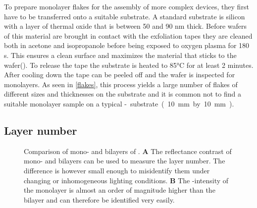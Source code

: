 To prepare monolayer flakes for the assembly of more complex devices, they first have to be transferred onto a suitable substrate. A standard substrate is silicon with a layer of thermal oxide that is between 50 and 90 nm thick. Before wafers of this material are brought in contact with the exfoliation tapes they are cleaned both in acetone and isopropanole before being exposed to oxygen plasma for 180 s. This ensures a clean surface and maximizes the material that sticks to the wafer(\cite{pizzocchero_hot_2016}). To release the tape the substrate is heated to 85°C for at least 2 minutes. After cooling down the tape can be peeled off and the wafer is inspected for monolayers. As seen in \ref{flakes}, this process yields a large number of flakes of different sizes and thicknesses on the substrate and it is common not to find a suitable monolayer sample on a typical \si-substrate (10 mm by 10 mm). 

\subsection{Layer number}

\begin{figure}
	\centering
	\begin{subfigure}{0.4\textwidth}
	\caption{}
	\end{subfigure}
	\begin{subfigure}{0.4\textwidth}
	\caption{}
	\end{subfigure}
	\caption{Comparison of mono- and bilayers of \wse\!. \textbf{A} The reflectance contrast of mono- and bilayers can be used to measure the layer number. The difference is however small enough to misidentify them under changing or inhomogeneous lighting conditions. \textbf{B} The \pl-intensity of the monolayer is almost an order of magnitude higher than the bilayer and can therefore be identified very easily.}
	\label{pl-contrast}
\end{figure}

